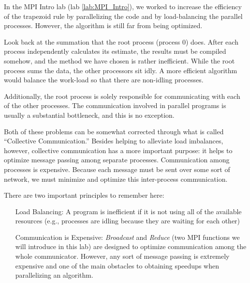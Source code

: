 \label{lab:MPI_Collective_Communication}

  In the MPI Intro lab (lab \ref{lab:MPI_Intro}), we worked to increase the efficiency of the trapezoid rule by parallelizing the code and by load-balancing the parallel processes. However, the algorithm is still far from being optimized.

  Look back at the summation that the root process (process 0) does. After each process independently calculates its estimate, the results must be compiled somehow, and the method we have chosen is rather inefficient. While the root process sums the data, the other processors sit idly. A more efficient algorithm would balance the work-load so that there are non-idling processes.

 Additionally, the root process is solely responsible for communicating with each of the other processes. The communication involved in parallel programs is usually a substantial bottleneck, and this is no exception.

  Both of these problems can be somewhat corrected through what is called ``Collective Communication.'' Besides helping to alleviate load imbalances, however, collective communication has a more important purpose: it helps to optimize message passing among separate processes. Communication among processes is expensive. Because each message must be sent over some sort of network, we must minimize and optimize this inter-process communication.

  There are two important principles to remember here:
  \begin{enumerate}
  \item[Load Balancing:]
    A program is inefficient if it is not using all of the available resources (e.g., processes are idling because they are waiting for each other)
  \item[Communication is Expensive:]
    \emph{Broadcast} and \emph{Reduce} (two MPI functions we will introduce in this lab) are designed to optimize communication among the whole communicator. However, any sort of message passing is extremely expensive and one of the main obstacles to obtaining speedups when parallelizing an algorithm.
  \end{enumerate}


